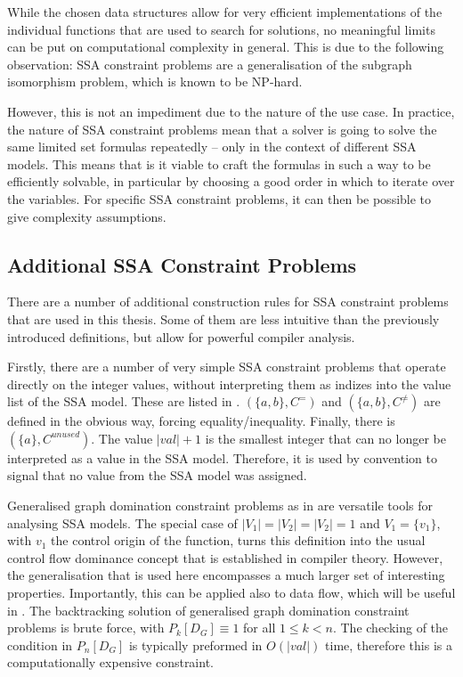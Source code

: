     While the chosen data structures allow for very efficient implementations
    of the individual functions that are used to search for solutions, no
    meaningful limits can be put on computational complexity in general.
    This is due to the following observation:
    SSA constraint problems are a generalisation of the subgraph isomorphism
    problem, which is known to be NP-hard.

    However, this is not an impediment due to the nature of the use case.
    In practice, the nature of SSA constraint problems mean that a solver is
    going to solve the same limited set formulas repeatedly -- only in the
    context of different SSA models.
    This means that is it viable to craft the formulas in such a way to be
    efficiently solvable, in particular by choosing a good order in which to
    iterate over the variables.
    For specific SSA constraint problems, it can then be possible to give
    complexity assumptions.

\subsection{Additional SSA Constraint Problems}

    There are a number of additional construction rules for SSA constraint
    problems that are used in this thesis.
    Some of them are less intuitive than the previously introduced definitions,
    but allow for powerful compiler analysis.

    Firstly, there are a number of very simple SSA constraint problems that
    operate directly on the integer values, without interpreting them as indizes
    into the value list of the SSA model.
    These are listed in .
    $(\{a,b\}, C^=)$ and $(\{a,b\}, C^{\neq})$ are defined in the
    obvious way, forcing equality/inequality.
    Finally, there is $(\{a\}, C^{unused})$.
    The value $|val|+1$ is the smallest integer that can no longer be
    interpreted as a value in the SSA model.
    Therefore, it is used by convention to signal that no value from the SSA
    model was assigned.

    Generalised graph domination constraint problems as in 
    are versatile tools for analysing SSA models.
    The special case of $|V_1|=|V_2|=|V_2|=1$ and $V_1=\{v_1\}$,
    with $v_1$ the control origin of the function, turns this definition into
    the usual control flow dominance concept that is established in compiler
    theory.
    However, the generalisation that is used here encompasses a much larger
    set of interesting properties.
    Importantly, this can be applied also to data flow, which will be useful in
    .
    The backtracking solution of generalised graph domination constraint
    problems is brute force, with $P_k[D_G]\equiv 1$ for all $1\leq k<n$.
    The checking of the condition in $P_n[D_G]$ is typically preformed in
    $O(|val|)$ time, therefore this is a computationally expensive constraint.

